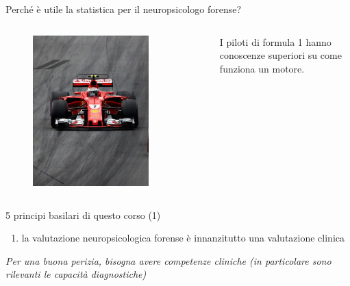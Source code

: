 \documentclass[
  ignorenonframetext,
]{beamer}
\providecommand{\tightlist}{%
  \setlength{\itemsep}{0pt}\setlength{\parskip}{0pt}}
\begin{document}
\begin{frame}{Perché è utile la statistica per il neuropsicologo
forense?}
\begin{columns}
\begin{figure}
\includegraphics[width=0.8\textwidth]{Figures/F1.png}
\end{figure}
\tiny{I piloti di formula 1 hanno conoscenze superiori su come funziona un motore.}

\end{columns}
\end{frame}

\begin{frame}{5 principi basilari di questo corso (1)}
\label{principi-basilari-di-questo-corso-1}
\begin{enumerate}[<+->]
\tightlist
\item
  la valutazione neuropsicologica forense è innanzitutto una valutazione
  clinica
\end{enumerate}

\vspace{3em}

\emph{Per una buona perizia, bisogna avere competenze cliniche (in
particolare sono rilevanti le capacità diagnostiche)}
\end{frame}
\end{document}

